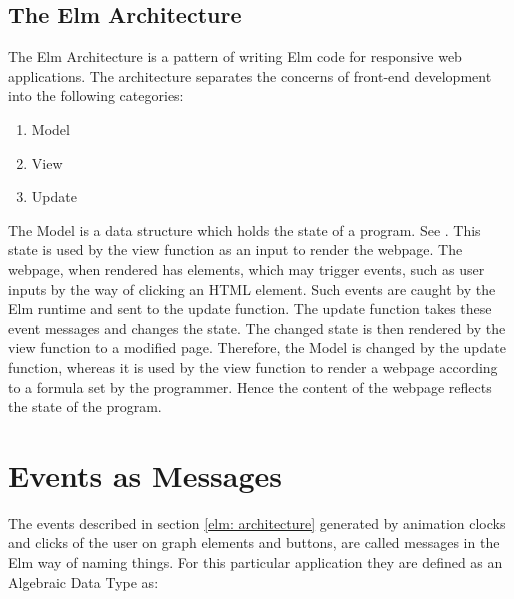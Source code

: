 \subsection{The Elm Architecture}
\label{elm: architecture}
The Elm Architecture is a pattern of writing Elm code for responsive web
applications.  The architecture separates the concerns of front-end development
into the following categories:

\begin{enumerate}
\item Model
\item View
\item Update
\end{enumerate}

The Model is a data structure which holds the state of a program. See
\cite{Fairbank19}. This state is used by the view function as an input to
render the webpage.  The webpage, when rendered has elements, which may trigger
events, such as user inputs by the way of clicking an HTML element. Such events
are caught by the Elm runtime and sent to the update function.  The update
function takes these event messages and changes the state. The changed state is
then rendered by the view function to a modified page.  Therefore, the Model is
changed by the update function, whereas it is used by the view function to
render a webpage according to a formula set by the programmer. Hence the content
of the webpage reflects the state of the program.


\section{Events as Messages}
\label{impl: messages}
The events described in section \autoref{elm: architecture} generated by
animation clocks and clicks of the user on graph elements and buttons, are
called messages in the Elm way of naming things. For this particular
application they are defined as an Algebraic Data Type as:

